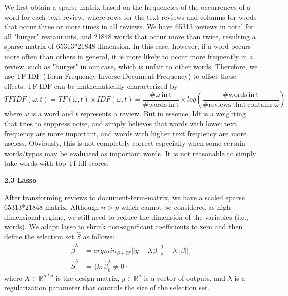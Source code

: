 \documentclass[12pt]{article}
\begin{document}
	We first obtain a sparse matrix based on the frequencies of the occurrences of a word for each text review, where rows for the text reviews and columns for words that occur three or more times in all reviews. We have 65313 reviews in total for all "burger" restaurants, and 21848 words that occur more than twice, resulting a sparse matrix of 65313*21848 dimension. In this case, however, if a word occurs more often than others in general, it is more likely to occur more frequently in a review, such as "burger" in our case, which is unfair to other words. Therefore, we use TF-IDF (Term Frequency-Inverse Document Frequency) to offset these effects. TF-IDF can be mathematically characterized by
	\begin{equation}
	TFIDF(\omega,t) = TF(\omega,t)\times IDF(\omega,t) = \frac{\mathrm{\#\omega~in~t}}{\mathrm{\#words~in~t}}\times log(\frac{\mathrm{\#words~in~t}}{\mathrm{\#reviews~that~contains~\omega}})
	\end{equation}
	where $\omega$ is a word and $t$ represents a review. But in essence, Idf is a weighting that tries to suppress noise, and simply believes that words with lower text frequency are more important, and words with higher text frequency are more useless. Obviously, this is not completely correct especially when some certain words/typos may be evaluated as important words. It is not reasonable to simply take words with top Tf-Idf scores.
	
	\noindent\textbf{2.3 Lasso}
	
	After transforming reviews to document-term-matrix, we have a scaled sparse 65313*21848 matrix. Although $n>p$ which cannot be considered as high-dimensional regime, we still need to reduce the dimension of the variables (i.e., words). We adapt lasso to shrink non-significant coefficients to zero and then define the selection set $\hat{S}$ as follows:
	\begin{equation}
	\begin{aligned}
	\hat{\beta}^\lambda &= argmin_{\beta \in \mathbb{R}^p} ||y-X\beta||_2^2+\lambda||\beta||_1\\
	\hat{S}^\lambda &= \{k:\hat{\beta}_k^\lambda \neq 0\}
	\end{aligned}
	\end{equation}
	where $X \in\mathbb{R} ^{n*p} $ is the design matrix, $y \in \mathbb{R}^n$ is a vector of outputs, and $\lambda$ is a regularization parameter that controls the size of the selection set.
	
\end{document}
